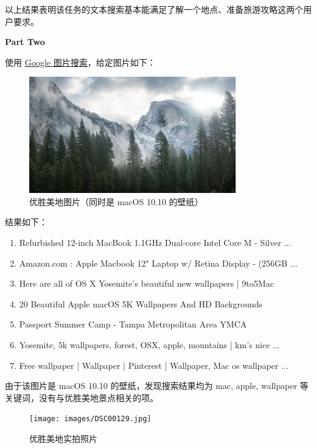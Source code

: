 \begin{homeworkProblem}
    以上结果表明该任务的文本搜索基本能满足了解一个地点、准备旅游攻略这两个用户要求。
    \\

    \pagebreak

    \textbf{Part Two}

    使用 \href{https://images.google.com}{Google 图片搜索}，给定图片如下：

    \begin{figure}[!h]
        \centering
        \includegraphics[width=0.8\textwidth]{images/yosemite.jpg}
        \caption{优胜美地图片（同时是 macOS 10.10 的壁纸）}
    \end{figure}

    结果如下：

    \begin{enumerate}
        \item Refurbished 12-inch MacBook 1.1GHz Dual-core Intel Core M - Silver ...
        \item Amazon.com : Apple Macbook 12" Laptop w/ Retina Display - (256GB ...
        \item Here are all of OS X Yosemite's beautiful new wallpapers | 9to5Mac
        \item 20 Beautiful Apple macOS 5K Wallpapers And HD Backgrounds
        \item Passport Summer Camp - Tampa Metropolitan Area YMCA
        \item Yosemite, 5k wallpapers, forest, OSX, apple, mountains | km's nice ...
        \item Free wallpaper | Wallpaper | Pinterest | Wallpaper, Mac os wallpaper ...
    \end{enumerate}

    由于该图片是 macOS 10.10 的壁纸，发现搜索结果均为 mac, apple, wallpaper 等关键词，没有与优胜美地景点相关的项。

    \pagebreak

    \begin{figure}[!h]
        \centering
        \texttt{[image: images/DSC00129.jpg]}
        \caption{优胜美地实拍照片}
    \end{figure}


\end{homeworkProblem}
